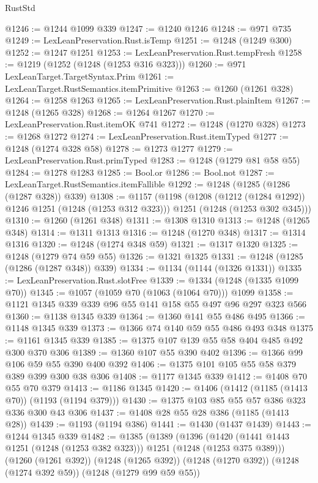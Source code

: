 \begin{lexlean}{RustStd}
\begin{coremodule}
@1246 := @1244 @1099 @339
@1247 := @1240 @1246
@1248 := @971 @735
@1249 := LexLeanPreservation.Rust.isTemp
@1251 := @1248 (@1249 @300)
@1252 := @1247 @1251
@1253 := LexLeanPreservation.Rust.tempFresh
@1258 := @1219 (@1252 (@1248 (@1253 @316 @323)))
@1260 := @971 LexLeanTarget.TargetSyntax.Prim
@1261 := LexLeanTarget.RustSemantics.itemPrimitive
@1263 := @1260 (@1261 @328)
@1264 := @1258 @1263
@1265 := LexLeanPreservation.Rust.plainItem
@1267 := @1248 (@1265 @328)
@1268 := @1264 @1267
@1270 := LexLeanPreservation.Rust.itemOK @741
@1272 := @1248 (@1270 @328)
@1273 := @1268 @1272
@1274 := LexLeanPreservation.Rust.itemTyped
@1277 := @1248 (@1274 @328 @58)
@1278 := @1273 @1277
@1279 := LexLeanPreservation.Rust.primTyped
@1283 := @1248 (@1279 @81 @58 @55)
@1284 := @1278 @1283
@1285 := Bool.or
@1286 := Bool.not
@1287 := LexLeanTarget.RustSemantics.itemFallible
@1292 := @1248 (@1285 (@1286 (@1287 @328)) @339)
@1308 := @1157
    (@1198
      (@1208 (@1212 (@1284 @1292)) @1246 @1251 (@1248 (@1253 @312 @323)))
      @1251
      (@1248 (@1253 @302 @345)))
@1310 := @1260 (@1261 @348)
@1311 := @1308 @1310
@1313 := @1248 (@1265 @348)
@1314 := @1311 @1313
@1316 := @1248 (@1270 @348)
@1317 := @1314 @1316
@1320 := @1248 (@1274 @348 @59)
@1321 := @1317 @1320
@1325 := @1248 (@1279 @74 @59 @55)
@1326 := @1321 @1325
@1331 := @1248 (@1285 (@1286 (@1287 @348)) @339)
@1334 := @1134 (@1144 (@1326 @1331))
@1335 := LexLeanPreservation.Rust.slotFree
@1339 := @1334 (@1248 (@1335 @1099 @70))
@1345 := @1057 (@1059 @70 (@1063 (@1064 @70))) @1099
@1358 := @1121 @1345 @339 @339 @96 @55 @141 @158 @55 @497 @96 @297 @323 @566
@1360 := @1138 @1345 @339
@1364 := @1360 @141 @55 @486 @495
@1366 := @1148 @1345 @339
@1373 := @1366 @74 @140 @59 @55 @486 @493 @348
@1375 := @1161 @1345 @339
@1385 := @1375 @107 @139 @55 @58 @404 @485 @492 @300 @370 @306
@1389 := @1360 @107 @55 @390 @402
@1396 := @1366 @99 @106 @59 @55 @390 @400 @392
@1406 := @1375 @101 @105 @55 @58 @379 @389 @399 @300 @38 @306
@1408 := @1177 @1345 @339
@1412 := @1408 @70 @55 @70 @379
@1413 := @1186 @1345
@1420 := @1406 (@1412 (@1185 (@1413 @70)) (@1193 (@1194 @379)))
@1430 := @1375 @103 @85 @55 @57 @386 @323 @336 @300 @43 @306
@1437 := @1408 @28 @55 @28 @386 (@1185 (@1413 @28))
@1439 := @1193 (@1194 @386)
@1441 := @1430 (@1437 @1439)
@1443 := @1244 @1345 @339
@1482 := @1385
    (@1389
      (@1396
        (@1420 (@1441 @1443 @1251 (@1248 (@1253 @382 @323))) @1251 (@1248 (@1253 @375 @389)))
        (@1260 (@1261 @392))
        (@1248 (@1265 @392))
        (@1248 (@1270 @392))
        (@1248 (@1274 @392 @59))
        (@1248 (@1279 @99 @59 @55))

\end{coremodule}
\end{lexlean}
